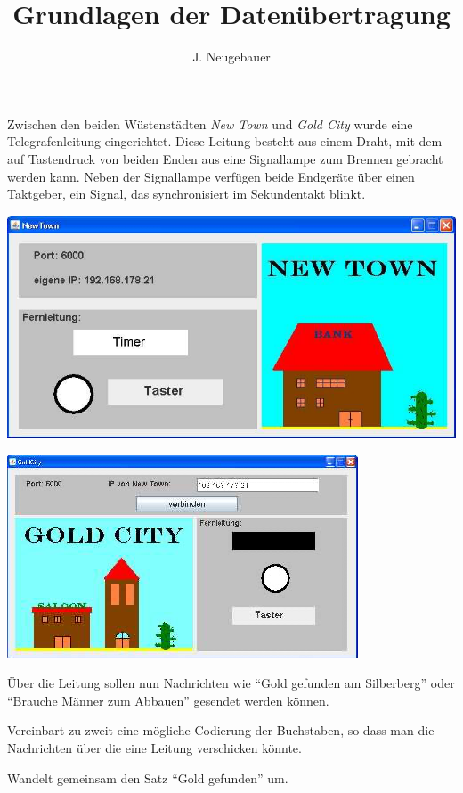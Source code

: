 \documentclass[10pt, a4paper]{scrartcl}
\author{J. Neugebauer}
\title{Grundlagen der Datenübertragung}
\date{\Heute}
\begin{document}
\ReiheTitel

Zwischen den beiden Wüstenstädten \emph{New Town} und \emph{Gold City} wurde eine Telegrafenleitung eingerichtet. Diese Leitung besteht aus einem Draht, mit dem auf Tastendruck von beiden Enden aus eine Signallampe zum Brennen gebracht werden kann. Neben der Signallampe verfügen beide Endgeräte über einen Taktgeber, ein Signal, das synchronisiert im Sekundentakt blinkt.

\begin{multicols}{2}\centering
	\vspace*{2mm}
	\includegraphics[width=.8\columnwidth]{Q2-GK-AB.II.1-Abb_New Town.png}

	\includegraphics[width=.8\columnwidth]{Q2-GK-AB.II.1-Abb_Gold City.png}
\end{multicols}

\begin{aufgabe}
	Über die Leitung sollen nun Nachrichten wie \enquote{Gold gefunden am Silberberg} oder \enquote{Brauche Männer zum Abbauen} gesendet werden können.

	\begin{teilaufgaben}
		\teilaufgabe Vereinbart zu zweit eine mögliche Codierung der Buchstaben, so dass man die Nachrichten über die eine Leitung verschicken könnte.

		\teilaufgabe Wandelt gemeinsam den Satz \enquote{Gold gefunden} um.
	\end{teilaufgaben}
\end{aufgabe}
\end{document}
